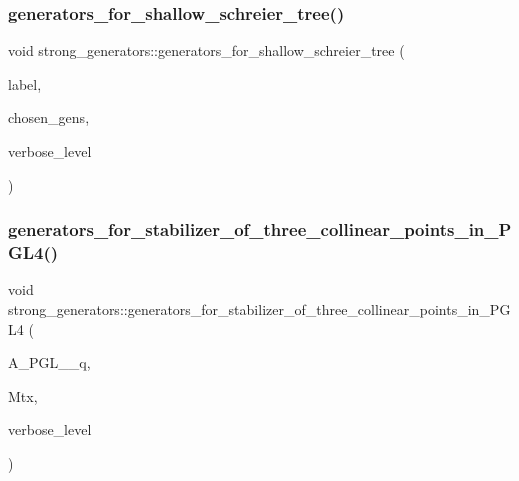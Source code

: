 \subsubsection{\texorpdfstring{generators\+\_\+for\+\_\+shallow\+\_\+schreier\+\_\+tree()}{generators\_for\_shallow\_schreier\_tree()}}
{\footnotesize\ttfamily void strong\+\_\+generators\+::generators\+\_\+for\+\_\+shallow\+\_\+schreier\+\_\+tree (\begin{DoxyParamCaption}\item[{\mbox{\hyperlink{galois_8h_ab6cc7b4aeb6ea31aba2b3fbfc83ff5e6}{B\+Y\+TE}} $\ast$}]{label,  }\item[{\mbox{\hyperlink{classvector__ge}{vector\+\_\+ge}} $\ast$}]{chosen\+\_\+gens,  }\item[{\mbox{\hyperlink{galois_8h_a09fddde158a3a20bd2dcadb609de11dc}{I\+NT}}}]{verbose\+\_\+level }\end{DoxyParamCaption})}

\mbox{\label{classstrong__generators_a59efd3b79710ccb1dce194a779ebf26e}} 
\subsubsection{\texorpdfstring{generators\+\_\+for\+\_\+stabilizer\+\_\+of\+\_\+three\+\_\+collinear\+\_\+points\+\_\+in\+\_\+\+P\+G\+L4()}{generators\_for\_stabilizer\_of\_three\_collinear\_points\_in\_PGL4()}}
{\footnotesize\ttfamily void strong\+\_\+generators\+::generators\+\_\+for\+\_\+stabilizer\+\_\+of\+\_\+three\+\_\+collinear\+\_\+points\+\_\+in\+\_\+\+P\+G\+L4 (\begin{DoxyParamCaption}\item[{\mbox{\hyperlink{classaction}{action}} $\ast$}]{A\+\_\+\+P\+G\+L\+\_\+\_\+q,  }\item[{\mbox{\hyperlink{classmatrix__group}{matrix\+\_\+group}} $\ast$}]{Mtx,  }\item[{\mbox{\hyperlink{galois_8h_a09fddde158a3a20bd2dcadb609de11dc}{I\+NT}}}]{verbose\+\_\+level }\end{DoxyParamCaption})}

